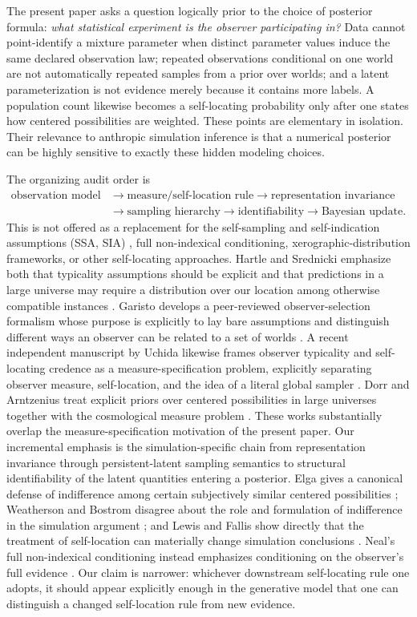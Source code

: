 \documentclass[11pt]{article}
\begin{document}
The present paper asks a question logically prior to the choice of posterior formula: \emph{what statistical experiment is the observer participating in?} Data cannot point-identify a mixture parameter when distinct parameter values induce the same declared observation law; repeated observations conditional on one world are not automatically repeated samples from a prior over worlds; and a latent parameterization is not evidence merely because it contains more labels. A population count likewise becomes a self-locating probability only after one states how centered possibilities are weighted. These points are elementary in isolation. Their relevance to anthropic simulation inference is that a numerical posterior can be highly sensitive to exactly these hidden modeling choices.

The organizing audit order is
\[
\begin{aligned}
\text{observation model}
&\to\text{measure/self-location rule}\to\text{representation invariance}\\
&\to\text{sampling hierarchy}\to\text{identifiability}\to\text{Bayesian update}.
\end{aligned}
\]
This is not offered as a replacement for the self-sampling and self-indication assumptions (SSA, SIA) \citep{bostrom2002}, full non-indexical conditioning, xerographic-distribution frameworks, or other self-locating approaches. Hartle and Srednicki emphasize both that typicality assumptions should be explicit and that predictions in a large universe may require a distribution over our location among otherwise compatible instances \citep{hartlesrednicki2007,srednickihartle2013}. Garisto develops a peer-reviewed observer-selection formalism whose purpose is explicitly to lay bare assumptions and distinguish different ways an observer can be related to a set of worlds \citep{garisto2020}. A recent independent manuscript by Uchida likewise frames observer typicality and self-locating credence as a measure-specification problem, explicitly separating observer measure, self-location, and the idea of a literal global sampler \citep{uchida2026}. Dorr and Arntzenius treat explicit priors over centered possibilities in large universes together with the cosmological measure problem \citep{dorrarntzenius2017}. These works substantially overlap the measure-specification motivation of the present paper. Our incremental emphasis is the simulation-specific chain from representation invariance through persistent-latent sampling semantics to structural identifiability of the latent quantities entering a posterior. Elga gives a canonical defense of indifference among certain subjectively similar centered possibilities \citep{elga2004}; Weatherson and Bostrom disagree about the role and formulation of indifference in the simulation argument \citep{weatherson2003,bostrom2005}; and Lewis and Fallis show directly that the treatment of self-location can materially change simulation conclusions \citep{fallislewis2023}. Neal's full non-indexical conditioning instead emphasizes conditioning on the observer's full evidence \citep{neal2006}. Our claim is narrower: whichever downstream self-locating rule one adopts, it should appear explicitly enough in the generative model that one can distinguish a changed self-location rule from new evidence.
\end{document}
